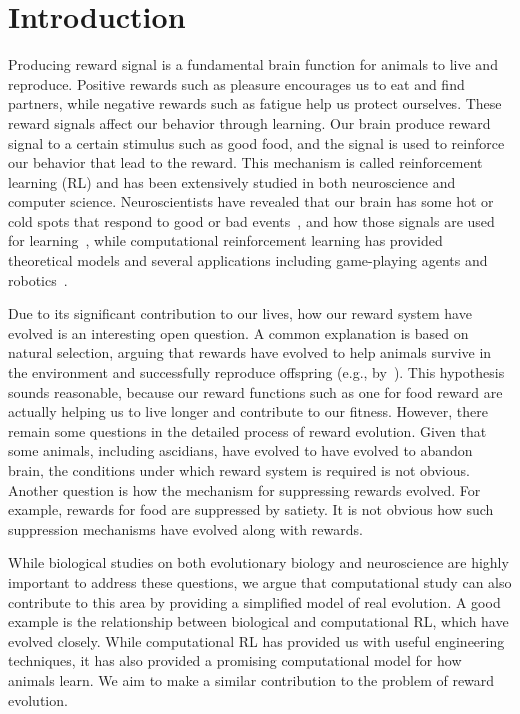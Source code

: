 \section{Introduction}
Producing reward signal is a fundamental brain function for animals to live and reproduce. Positive rewards such as pleasure encourages us to eat and find partners, while negative rewards such as fatigue help us protect ourselves. These reward signals affect our behavior through learning. Our brain produce reward signal to a certain stimulus such as good food, and the signal is used to reinforce our behavior that lead to the reward. This mechanism is called reinforcement learning (RL) and has been extensively studied in both neuroscience and computer science. Neuroscientists have revealed that our brain has some hot or cold spots that respond to good or bad events~\citep{berridgeAffectiveNeurosciencePleasure2008}, and how those signals are used for learning~\citep{schultzNeuronalRewardDecision2015}, while computational reinforcement learning has provided theoretical models and several applications including game-playing agents and robotics~\citep{suttonReinforcementLearningIntroduction2018}.

Due to its significant contribution to our lives, how our reward system have evolved is an interesting open question. A common explanation is based on natural selection, arguing that rewards have evolved to help animals survive in the environment and successfully reproduce offspring (e.g., by~\cite{schultzNeuronalRewardDecision2015}). This hypothesis sounds reasonable, because our reward functions such as one for food reward are actually helping us to live longer and contribute to our fitness. However, there remain some questions in the detailed process of reward evolution. Given that some animals, including ascidians, have evolved to have evolved to abandon brain, the conditions under which reward system is required is not obvious. Another question is how the mechanism for suppressing rewards evolved. For example, rewards for food are suppressed by satiety. It is not obvious how such suppression mechanisms have evolved along with rewards.

While biological studies on both evolutionary biology and neuroscience are highly important to address these questions, we argue that computational study can also contribute to this area by providing a simplified model of real evolution. A good example is the relationship between biological and computational RL, which have evolved closely. While computational RL has provided us with useful engineering techniques, it has also provided a promising computational model for how animals learn. We aim to make a similar contribution to the problem of reward evolution.

